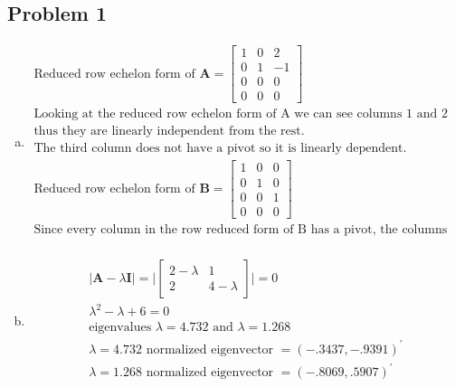 \documentclass{article}
\begin{document}
\begin{flushleft}

	\section*{Problem 1}
\begin{enumerate}[(a)]
	\item 
\begin{multline*}
\text{Reduced row echelon form of } \boldsymbol{A}=\begin{bmatrix}
1&0&2\\
0&1&-1\\
0&0&0\\
0&0&0
\end{bmatrix}\\
\text{Looking at the reduced row echelon form of A we can see columns 1 and 2 have pivots,}\\
\text{thus they are linearly independent from the rest.}\\
\text{The third column does not have a pivot so it is linearly dependent.}\\
\text{Reduced row echelon form of } \boldsymbol{B}=\begin{bmatrix}
1&0&0\\
0&1&0\\
0&0&1\\
0&0&0
\end{bmatrix}\\
\text{Since every column in the row reduced form of B has a pivot, the columns are linearly independent}\\
\end{multline*}
	\item 
\begin{multline*}
|\boldsymbol{A}-\lambda\boldsymbol{I}|=\bigg|\begin{bmatrix}
2-\lambda & 1\\
2 & 4-\lambda
\end{bmatrix}\bigg|=0\\
\lambda^2-\lambda+6=0\\
\text{eigenvalues } \lambda = 4.732 \text{ and } \lambda = 1.268\\
\lambda = 4.732 \text{ normalized eigenvector }=(-.3437,-.9391)^{'}\\
\lambda = 1.268 \text{ normalized eigenvector }=(-.8069,.5907)^{'}\\
\end{multline*}

\end{enumerate}


\end{flushleft}
\end{document}
